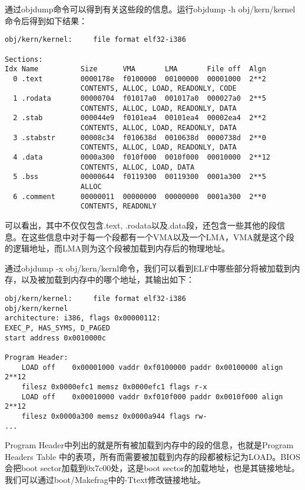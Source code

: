 \par 通过objdump命令可以得到有关这些段的信息。运行objdump -h obj/kern/kernel命令后得到如下结果：

\begin{lstlisting}[numbers=none]
   obj/kern/kernel:     file format elf32-i386

Sections:
Idx Name          Size      VMA       LMA       File off  Algn
  0 .text         0000178e  f0100000  00100000  00001000  2**2
                  CONTENTS, ALLOC, LOAD, READONLY, CODE
  1 .rodata       00000704  f01017a0  001017a0  000027a0  2**5
                  CONTENTS, ALLOC, LOAD, READONLY, DATA
  2 .stab         000044e9  f0101ea4  00101ea4  00002ea4  2**2
                  CONTENTS, ALLOC, LOAD, READONLY, DATA
  3 .stabstr      00008c34  f010638d  0010638d  0000738d  2**0
                  CONTENTS, ALLOC, LOAD, READONLY, DATA
  4 .data         0000a300  f010f000  0010f000  00010000  2**12
                  CONTENTS, ALLOC, LOAD, DATA
  5 .bss          00000644  f0119300  00119300  0001a300  2**5
                  ALLOC
  6 .comment      00000011  00000000  00000000  0001a300  2**0
                  CONTENTS, READONLY
\end{lstlisting}
\par 可以看出，其中不仅仅包含.text, .rodata以及.data段，还包含一些其他的段信息。在这些信息中对于每一个段都有一个VMA以及一个LMA，VMA就是这个段的逻辑地址，而LMA则为这个段被加载到内存后的物理地址。

\par 通过objdump -x obj/kern/kernl命令，我们可以看到ELF中哪些部分将被加载到内存，以及被加载到内存中的哪个地址，其输出如下：
\begin{lstlisting}[numbers=none]
obj/kern/kernel:     file format elf32-i386
obj/kern/kernel
architecture: i386, flags 0x00000112:
EXEC_P, HAS_SYMS, D_PAGED
start address 0x0010000c

Program Header:
    LOAD off    0x00001000 vaddr 0xf0100000 paddr 0x00100000 align 2**12
    filesz 0x0000efc1 memsz 0x0000efc1 flags r-x
    LOAD off    0x00010000 vaddr 0xf010f000 paddr 0x0010f000 align 2**12
    filesz 0x0000a300 memsz 0x0000a944 flags rw-
...
\end{lstlisting}
\par Program Header中列出的就是所有被加载到内存中的段的信息，也就是Program Headers Table 中的表项，所有而需要被加载到内存的段都被标记为LOAD。BIOS会把boot sector加载到0x7c00处，这是boot sector的加载地址，也是其链接地址。我们可以通过boot/Makefrag中的-Ttext修改链接地址。

